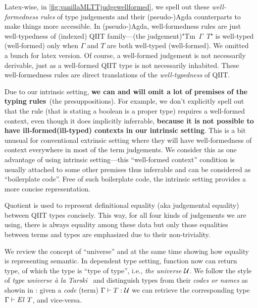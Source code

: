 Latex-wise, in \cref{fig:vanillaMLTTjudgewellformed}, we spell out these \textit{well-formedness rules} of type
judgements and their (pseudo-)Agda counterparts to make things more accessible. In (pseudo-)Agda, well-formedness rules are just well-typedness of (indexed) QIIT family---(the judgement)"Tm~$\Gamma$~$T$" is well-typed (well-formed) only when $\Gamma$ and $T$ are both well-typed (well-formed). We omitted a bunch for latex version. Of
course, a well-formed judgement is not necessarily derivable, just as
a well-formed QIIT type is not necessarily inhabited. 
These well-formedness rules are direct translations of the \textit{well-typedness} of QIIT. 

Due to our intrinsic setting, \textbf{we can and will omit a lot of premises of the typing rules}~(the presuppositions). 
For example, we don't explicitly
spell out that the rule  (that is stating a boolean is a proper type) requires a well-formed
context, even though it does implicitly inferrable, \textbf{because it is not
possible to have ill-formed(ill-typed) contexts in our intrinsic setting}. This is
a bit unusual for conventional extrinsic setting where they will have
well-formedness of context everywhere in most of the term judgements. We
consider this as one advantage of using intrinsic setting---this
``well-formed context'' condition is usually attached to some other premises thus
inferrable and can be considered as ``boilerplate code''. Free of
such boilerplate code, the intrinsic setting provides a more concise
representation.


Quotient is used to represent definitional equality (aka judgemental
equality) between QIIT types concisely.
This way, for all four kinds of judgements we are
using, there is always equality among these data but only those equalities between terms and types are emphasized due to their non-triviality.


We review the concept of ``universe'' and at the same time showing how equality is representing semantic. In dependent type setting, function now can return type, of which the type is ``type of type'', i.e., \textit{the universe} ${\mathcal{U}}$. We follow the style of \textit{type universe à la Tarski}~\cite{hofmann1997syntax} and
distinguish types from their \textit{codes or names} as showin in : given a \textit{code} (term) ${ {\Gamma} \vdash {T} : {{\mathcal{U}}} }$ we can retrieve the corresponding type
${ {\Gamma} \vdash {El~T} }$, and vice-versa.


